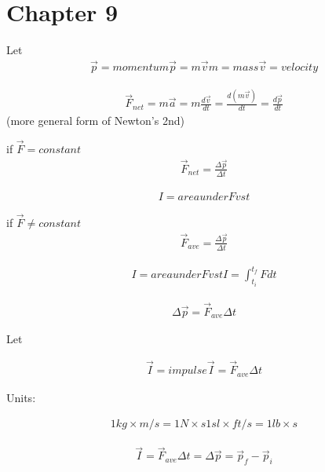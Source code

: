 \section{Chapter 9}
	Let
	\begin{align}
		\vec{p} = momentum
		\vec{p} = m\vec{v}
		m = mass
		\vec{v} = velocity
	\end{align}

	\begin{align}
		\vec{F}_{net} = m\vec{a}
		= m\frac{d\vec{v}}{dt}
		= \frac{d(m\vec{v})}{dt}
		= \frac{d\vec{p}}{dt}
	\end{align}
	(more general form of Newton's 2nd)

	if $\vec{F} = constant$
	\begin{align}
		\vec{F}_{net} = \frac{\Delta \vec{p}}{\Delta t}
	\end{align}

	\begin{align}
		I = area under F vs t
	\end{align}

	if $\vec{F} \neq constant$
	\begin{align}
		\vec{F}_{ave} = \frac{\Delta \vec{p}}{\Delta t}
	\end{align}

	\begin{align}
		I = area under F vs t
		I = \int_{t_i}^{t_f} F dt
	\end{align}

	\begin{align}
		\Delta \vec{p} = \vec{F}_{ave} \Delta t
	\end{align}

	Let

	\begin{align}
		\vec{I} = impulse
		\vec{I} = \vec{F}_{ave} \Delta t
	\end{align}

	Units:

	\begin{align}
		1 kg \times m/s = 1 N \times s
		1 sl \times ft/s = 1 lb \times s
	\end{align}

	\begin{align}
		\vec{I} = \vec{F}_{ave} \Delta t = \Delta \vec{p} = \vec{p}_{f} - \vec{p}_{i}
	\end{align}

